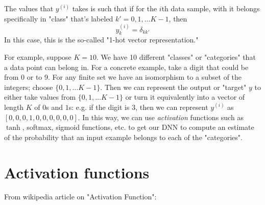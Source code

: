 \documentclass[10pt]{amsart}
\begin{document}
\begin{multicols*}{2}
The values that $y^{(i)}$ takes is such that if for the $i$th data sample, with it belongs specifically in "class" that's labeled $k'=0,1,\dots K-1$, then 
\[
y^{(i)}_k = \delta_{kk'}
\]
In this case, this is the so-called "1-hot vector representation."  

For example, suppose $K=10$.  We have 10 different "classes" or "categories" that a data point can belong in.  For a concrete example, take a digit that could be from 0 or to 9.  For any finite set we have an isomorphism to a subset of the integers; choose $\lbrace 0 ,1,\dots K-1\rbrace$.  Then we can represent the output or "target" $y$ to either take values from $\lbrace 0 ,1,\dots K-1\rbrace$ or turn it equivalently into a vector of length $K$ of $0$s and $1$s: e.g. if the digit is 3, then we can represent $y^{(i)}$ as $[0,0,0,1,0,0,0,0,0,0]$.  In this way, we can use \emph{activation} functions such as $\tanh$, softmax, sigmoid functions, etc. to get our DNN to compute an estimate of the probability that an input example belongs to each of the "categories".    






\section{Activation functions}

From wikipedia article on "Activation Function":


\end{multicols*}
\end{document}
